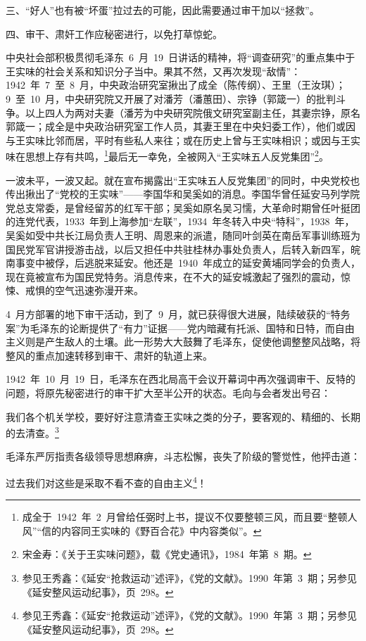 三、“好人”也有被“坏蛋”拉过去的可能，因此需要通过审干加以“拯救”。

四、审干、肃奸工作应秘密进行，以免打草惊蛇。

中央社会部积极贯彻毛泽东~6~月~19~日讲话的精神，将“调查研究”的重点集中于王实味的社会关系和知识分子当中。果其不然，又再次发现“敌情”：1942~年~7~至~8~月，中央政治研究室揪出了成全（陈传纲）、王里（王汝琪）；9~至~10~月，中央研究院又开展了对潘芳（潘蕙田）、宗铮（郭箴一）的批判斗争。以上四人为两对夫妻（潘芳为中央研究院俄文研究室副主任，其妻宗铮，原名郭箴一；成全是中央政治研究室工作人员，其妻王里在中央妇委工作），他们或因与王实味比邻而居，平时有些私人来往；或在历史上曾与王实味相识；或因与王实味在思想上存有共鸣，\footnote{成全于~1942~年~2~月曾给任弼时上书，提议不仅要整顿三风，而且要“整顿人风”“信的内容同王实味的《野百合花》中内容类似”。}最后无一幸免，全被网入“王实味五人反党集团”\footnote{宋金寿：《关于王实味问题》，载《党史通讯》，1984~年第~8~期。}。

一波未平，一波又起。就在宣布揭露出“王实味五人反党集团”的同时，中央党校也传出揪出了“党校的王实味”——李国华和吴奚如的消息。李国华曾任延安马列学院党总支常委，是曾经留苏的红军干部；吴奚如原名吴习懦，大革命时期曾任叶挺团的连党代表，1933~年到上海参加“左联”，1934~年冬转入中央“特科”，1938~年，吴奚如受中共长江局负责人王明、周恩来的派遣，随同叶剑英在南岳军事训练班为国民党军官讲授游击战，以后又担任中共驻桂林办事处负责人，后转入新四军，皖南事变中被俘，后逃脱来延安。他还是~1940~年成立的延安黄埔同学会的负责人，现在竟被宣布为国民党特务。消息传来，在不大的延安城激起了强烈的震动，惊悚、戒惧的空气迅速弥漫开来。

4~月方部署的地下审干活动，到了~9~月，就已获得很大进展，陆续破获的“特务案”为毛泽东的论断提供了“有力”证据——党内暗藏有托派、国特和日特，而自由主义则是产生敌人的土壤。此一形势大大鼓舞了毛泽东，促使他调整整风战略，将整风的重点加速转移到审干、肃奸的轨道上来。

1942~年~10~月~19~日，毛泽东在西北局高干会议开幕词中再次强调审干、反特的问题，将原先秘密进行的审干扩大至半公开的状态。毛向与会者发出号召：

\begin{quoting}
我们各个机关学校，要好好注意清查王实味之类的分子，要客观的、精细的、长期的去清查。\footnote{参见王秀鑫：《延安“抢救运动”述评》，《党的文献》。1990~年第~3~期；另参见《延安整风运动纪事》，页~298。}
\end{quoting}

毛泽东严厉指责各级领导思想麻痹，斗志松懈，丧失了阶级的警觉性，他抨击道：

\begin{quoting}
过去我们对这些是采取不看不查的自由主义\footnote{参见王秀鑫：《延安“抢救运动”述评》，《党的文献》。1990~年第~3~期；另参见《延安整风运动纪事》，页~298。}！
\end{quoting}

